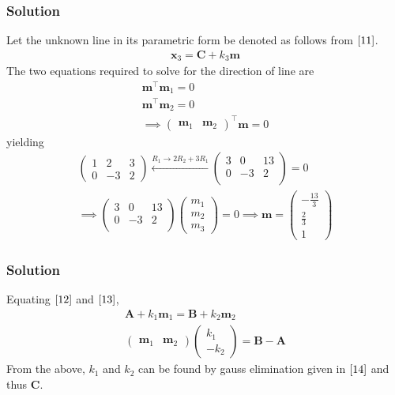 \documentclass{beamer}
\theoremstyle{remark}
\newcommand{\myvec}[1]{\ensuremath{\begin{pmatrix}#1\end{pmatrix}}}
\let\vec\mathbf
\begin{document}
\begin{frame}
\frametitle{Solution}
Let the unknown line in its parametric form be denoted as follows from $\eqref{11}$.
\begin{align}
    \vec{x}_3 = \vec{C} + k_3\vec{m}
\end{align}
The two equations required to solve for the direction of line are 
\begin{align}
\vec{m}^\top\vec{m}_1 = 0\\
\vec{m}^\top\vec{m}_2 = 0\\
	\implies \myvec{\vec{m}_1 &\vec{m}_2}^{\top}\vec{m} = 0
\end{align}
yielding
\begin{align}
    \myvec{
        1 & 2 & 3\\
        0 & -3 & 2   
    } \xleftarrow{R_1 \to 2R_2 + 3R_1} \myvec{
        3 & 0 & 13\\
        0 & -3 & 2   \\
    } = 0\\
  \implies  \myvec{
        3 & 0 & 13\\
        0 & -3 & 2   \\
    }\myvec{
        m_1\\
        m_2\\
        m_3
    } = 0
    \implies \vec{m} = \myvec{
	    -\frac{13}{3}\\[1ex]
        \frac{2}{3}\\[1ex]
        1
    }
\end{align}
\end{frame}
%
\begin{frame}
\frametitle{Solution}
Equating $\eqref{12}$ and $\eqref{13}$,
\begin{align}
    \vec{A} + k_1\vec{m}_1 = \vec{B} + k_2\vec{m}_2\\
    \myvec{
        \vec{m}_1 & \vec{m}_2
    }\myvec{
        k_1 \\
        -k_2
    } = \vec{B}-\vec{A}
\end{align}
From the above, $k_1$ and $k_2$ can be found by gauss elimination given in $\eqref{14}$ and thus $\vec{C}$.

\end{frame}
\end{document}
